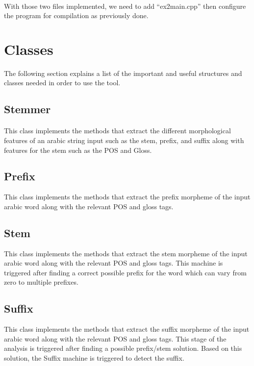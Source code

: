 \documentclass{article}
\begin{document}
\paragraph{}
With those two files implemented, we need to add ``ex2main.cpp'' then configure the program for compilation as previously done.

\section{Classes}
\label{sec:classes}

\paragraph{}
The following section explains a list of the important and useful structures and classes needed in order to use the tool.

\subsection{Stemmer}
\paragraph{}
This class implements the methods that extract the different morphological features of an arabic string input such as the stem, prefix, and suffix along with features for the stem such as the POS and Gloss.

\subsection{Prefix}
This class implements the methods that extract the prefix morpheme of the input arabic word along with the relevant POS and gloss tags.


\subsection{Stem}
This class implements the methods that extract the stem morpheme of the input arabic word along with the relevant POS and gloss tags. This machine is triggered after finding a correct possible prefix for the word which can vary from zero to multiple prefixes.

\subsection{Suffix}
This class implements the methods that extract the suffix morpheme of the input arabic word along with the relevant POS and gloss tags. This stage of the analysis is triggered after finding a possible prefix/stem solution. Based on this solution, the Suffix machine is triggered to detect the suffix.
\end{document}
